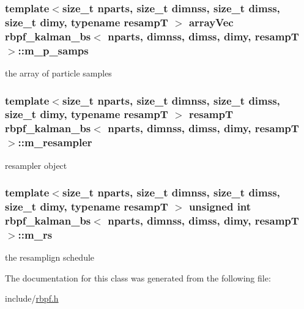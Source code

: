 \subsubsection[{\texorpdfstring{m\+\_\+p\+\_\+samps}{m_p_samps}}]{\setlength{\rightskip}{0pt plus 5cm}template$<$size\+\_\+t nparts, size\+\_\+t dimnss, size\+\_\+t dimss, size\+\_\+t dimy, typename resampT $>$ {\bf array\+Vec} {\bf rbpf\+\_\+kalman\+\_\+bs}$<$ nparts, dimnss, dimss, dimy, resampT $>$\+::m\+\_\+p\+\_\+samps\hspace{0.3cm}{\ttfamily [private]}}\hypertarget{classrbpf__kalman__bs_a763eb2ce41bc321803f89b78b732573f}{}\label{classrbpf__kalman__bs_a763eb2ce41bc321803f89b78b732573f}
the array of particle samples 
\subsubsection[{\texorpdfstring{m\+\_\+resampler}{m_resampler}}]{\setlength{\rightskip}{0pt plus 5cm}template$<$size\+\_\+t nparts, size\+\_\+t dimnss, size\+\_\+t dimss, size\+\_\+t dimy, typename resampT $>$ resampT {\bf rbpf\+\_\+kalman\+\_\+bs}$<$ nparts, dimnss, dimss, dimy, resampT $>$\+::m\+\_\+resampler\hspace{0.3cm}{\ttfamily [private]}}\hypertarget{classrbpf__kalman__bs_aaadb68075e736f9eca8925623020aaba}{}\label{classrbpf__kalman__bs_aaadb68075e736f9eca8925623020aaba}
resampler object 
\subsubsection[{\texorpdfstring{m\+\_\+rs}{m_rs}}]{\setlength{\rightskip}{0pt plus 5cm}template$<$size\+\_\+t nparts, size\+\_\+t dimnss, size\+\_\+t dimss, size\+\_\+t dimy, typename resampT $>$ unsigned int {\bf rbpf\+\_\+kalman\+\_\+bs}$<$ nparts, dimnss, dimss, dimy, resampT $>$\+::m\+\_\+rs\hspace{0.3cm}{\ttfamily [private]}}\hypertarget{classrbpf__kalman__bs_a6d86ffa1e023e3cdcd429fe035c08cfd}{}\label{classrbpf__kalman__bs_a6d86ffa1e023e3cdcd429fe035c08cfd}
the resamplign schedule 

The documentation for this class was generated from the following file\+:\begin{DoxyCompactItemize}
\item 
include/\hyperlink{rbpf_8h}{rbpf.\+h}\end{DoxyCompactItemize}
